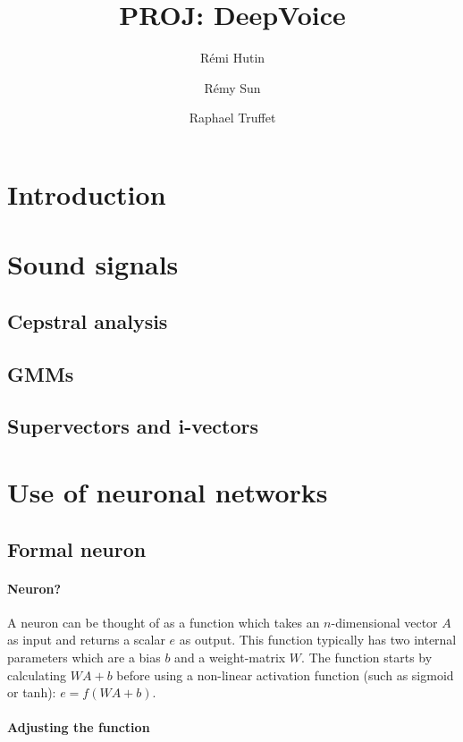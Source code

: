 \documentclass{article}
\title{PROJ: DeepVoice}
\author{Rémi Hutin \and Rémy Sun \and Raphael Truffet}
\begin{document}
\maketitle

\section{Introduction}

\section{Sound signals}

\subsection{Cepstral analysis}

\subsection{GMMs}

\subsection{Supervectors and i-vectors}

\section{Use of neuronal networks}

\subsection{Formal neuron}

\paragraph{Neuron?}
A neuron can be thought of as a function which takes an $n$-dimensional vector $A$ as input and returns a scalar $e$ as output. This function typically has two internal parameters which are a bias $b$ and a weight-matrix $W$. The function starts by calculating $WA+b$ before using a non-linear activation function (such as sigmoid or tanh): $e=f(WA+b)$.

\paragraph{Adjusting the function}
\end{document}
